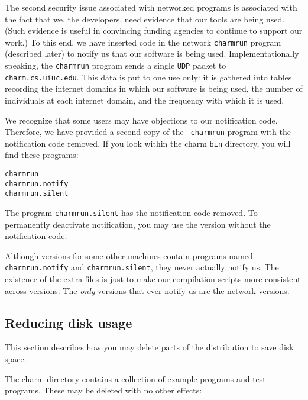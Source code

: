 The second security issue associated with networked programs is
associated with the fact that we, the \charmpp{} developers, need evidence
that our tools are being used.  (Such evidence is useful in convincing
funding agencies to continue to support our work.)  To this end, we
have inserted code in the network {\tt charmrun} program (described
later) to notify us that our software is being used.
Implementationally speaking, the {\tt charmrun} program sends a
single {\tt UDP} packet to {\tt charm.cs.uiuc.edu}.  This data is put
to one use only: it is gathered into tables recording the internet
domains in which our software is being used, the number of individuals
at each internet domain, and the frequency with which it is used.

We recognize that some users may have objections to our notification
code.  Therefore, we have provided a second copy of the {\tt
charmrun} program with the notification code removed.  If you look
within the charm {\tt bin} directory, you will find these programs:

\begin{alltt}
    % cd /usr/local/charm/bin
    % ls charmrun*
    charmrun
    charmrun.notify
    charmrun.silent
\end{alltt}

The program {\tt charmrun.silent} has the notification code removed.  To
permanently deactivate notification, you may use the version without the
notification code:

\begin{alltt}
    % cd /usr/local/charm/bin
    % cp charmrun.silent charmrun
\end{alltt}

Although versions for some other machines contain
programs named {\tt charmrun.notify} and {\tt charmrun.silent}, they
never actually notify us.  The existence of the extra files is just to
make our compilation scripts more consistent across versions.  The
{\em only} versions that ever notify us are the network versions.

\subsection{Reducing disk usage}

This section describes how you may delete parts of the distribution to
save disk space.  

The charm directory contains a collection of example-programs and
test-programs.  These may be deleted with no other effects:

